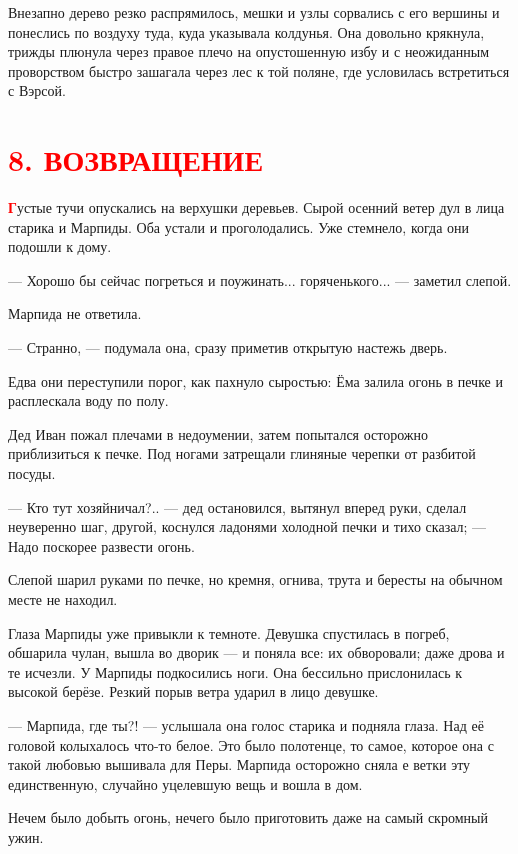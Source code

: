 \documentclass[oneside,final,14pt]{extreport}
\begin{document}
	Внезапно дерево резко распрямилось, мешки и узлы сорвались с его вершины и понеслись по воздуху туда, куда указывала колдунья. Она довольно крякнула, трижды плюнула через правое плечо на опустошенную избу и с неожиданным проворством быстро зашагала через лес к той поляне, где условилась встретиться с Вэрсой.
	
	\section[8. Возвращение]{\center \textcolor{red}{8. ВОЗВРАЩЕНИЕ}}
	
\lettrine[findent=0pt]{\textbf{\textcolor{red}{Г}}}{}устые тучи опускались на верхушки деревьев. Сырой осенний ветер дул в лица старика и Марпиды. Оба устали и проголодались. Уже стемнело, когда они подошли к дому.
	
	— Хорошо бы сейчас погреться и поужинать... горяченького... — заметил слепой.
	
	Марпида не ответила.
	
	— Странно, — подумала она, сразу приметив открытую настежь дверь.
	
	Едва они переступили порог, как пахнуло сыростью: Ёма залила огонь в печке и расплескала воду по полу.
	
	Дед Иван пожал плечами в недоумении, затем попытался осторожно приблизиться к печке. Под ногами затрещали глиняные черепки от разбитой посуды.
	
	— Кто тут хозяйничал?.. — дед остановился, вытянул вперед руки, сделал неуверенно шаг, другой, коснулся ладонями холодной печки и тихо сказал; — Надо поскорее развести огонь.
	
	Слепой шарил руками по печке, но кремня, огнива, трута и бересты на обычном месте не находил.
	
	Глаза Марпиды уже привыкли к темноте. Девушка спустилась в погреб, обшарила чулан, вышла во дворик — и поняла все: их обворовали; даже дрова и те исчезли. У Марпиды подкосились ноги. Она бессильно прислонилась к высокой берёзе. Резкий порыв ветра ударил в лицо девушке.
	
	— Марпида, где ты?! — услышала она голос старика и подняла глаза. Над её головой колыхалось что-то белое. Это было полотенце, то самое, которое она с такой любовью вышивала для Перы. Марпида осторожно сняла е ветки эту единственную, случайно уцелевшую вещь и вошла в дом.
	
	Нечем было добыть огонь, нечего было приготовить даже на самый скромный ужин.
	
\end{document}
